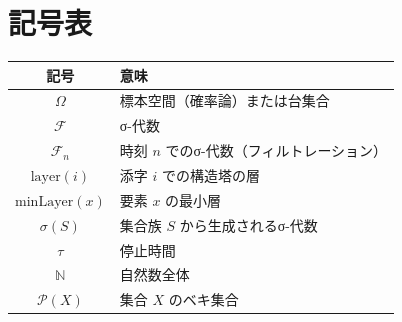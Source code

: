 \documentclass[a4paper,12pt]{ltjsarticle}
\theoremstyle{definition}
\begin{document}
\section{記号表}

\begin{center}
\begin{tabular}{|c|l|}
\hline
記号 & 意味 \\
\hline\hline
$\Omega$ & 標本空間（確率論）または台集合 \\
$\mathcal{F}$ & σ-代数 \\
$\mathcal{F}_n$ & 時刻 $n$ でのσ-代数（フィルトレーション） \\
$\mathrm{layer}(i)$ & 添字 $i$ での構造塔の層 \\
$\mathrm{minLayer}(x)$ & 要素 $x$ の最小層 \\
$\sigma(S)$ & 集合族 $S$ から生成されるσ-代数 \\
$\tau$ & 停止時間 \\
$\mathbb{N}$ & 自然数全体 \\
$\mathcal{P}(X)$ & 集合 $X$ のベキ集合 \\
\hline
\end{tabular}
\end{center}
\end{document}
